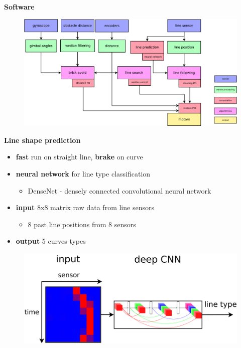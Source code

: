\documentclass[xcolor=dvipsnames]{beamer}
\begin{document}
\begin{frame}{\bf Software}

\begin{figure}
    \includegraphics[scale=0.2]{../../diagrams/motoko_suftware_blocks.png}
\end{figure}


\end{frame}

\begin{frame}{\bf Line shape prediction}

\begin{itemize}
    \item {\bf fast} run on straight line, {\bf brake} on curve
    \item {\bf neural network} for line type classification
        \begin{itemize}
            \item DenseNet - densely connected convolutional neural network
        \end{itemize}
    \item {\bf input} 8x8 matrix raw data from line sensors
        \begin{itemize}
            \item 8 past line positions from 8 sensors
        \end{itemize}
    \item {\bf output} 5 curves types
\end{itemize}

\begin{figure}
    \includegraphics[scale=0.3]{../../diagrams/line_classification.png}
\end{figure}

\end{frame}
\end{document}
